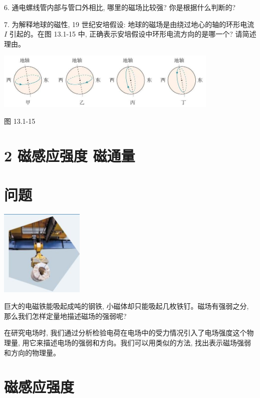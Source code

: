 \documentclass[10pt]{article}
\begin{document}
6. 通电螺线管内部与管口外相比, 哪里的磁场比较强? 你是根据什么判断的?

7. 为解释地球的磁性, 19 世纪安培假设: 地球的磁场是由绕过地心的轴的环形电流 \(I\) 引起的。在图 13.1-15 中, 正确表示安培假设中环形电流方向的是哪一个? 请简述理由。

\begin{center}
\includegraphics[max width=0.8\textwidth]{images/01911d5f-8e38-70c0-b5b8-2b399bd115b6_113_294282.jpg}
\end{center}

图 13.1-15

\section*{2 磁感应强度 磁通量}

\section*{问题}

\begin{center}
\includegraphics[max width=0.3\textwidth]{images/01911d5f-8e38-70c0-b5b8-2b399bd115b6_114_681593.jpg}
\end{center}

巨大的电磁铁能吸起成吨的钢铁, 小磁体却只能吸起几枚铁钉。磁场有强弱之分, 那么我们怎样定量地描述磁场的强弱呢?

在研究电场时, 我们通过分析检验电荷在电场中的受力情况引入了电场强度这个物理量, 用它来描述电场的强弱和方向。我们可以用类似的方法, 找出表示磁场强弱和方向的物理量。

\section*{磁感应强度}
\end{document}
